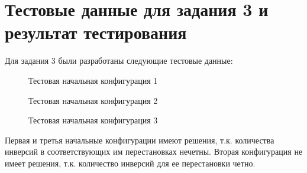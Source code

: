 \documentclass{article}
\begin{document}
\section*{Тестовые данные для задания 3 и результат тестирования}
Для задания 3 были разработаны следующие тестовые данные:
\begin{figure}[H]
  \caption{Тестовая начальная конфигурация 1}
  \label{fig:test1}
\end{figure}
\begin{figure}[H]
  \caption{Тестовая начальная конфигурация 2}
  \label{fig:test2}
\end{figure}
\begin{figure}[H]
  \caption{Тестовая начальная конфигурация 3}
  \label{fig:test3}
\end{figure}
Первая и третья начальные конфигурации имеют решения, т.к. количества
инверсий в соответствующих им перестановках нечетны. Вторая
конфигурация не имеет решения, т.к. количество инверсий для ее
перестановки четно.
\end{document}
